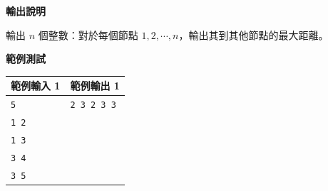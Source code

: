     \textbf{輸出說明}

    輸出 $n$ 個整數：對於每個節點 $1, 2,\cdots , n$，輸出其到其他節點的最大距離。

    \textbf{範例測試}

    \begin{tabular}{|m{7cm}|m{7cm}|}
        \hline
        範例輸入 1 & 範例輸出 1 \\
        \hline
        \verb|5|  & \verb|2 3 2 3 3| \\
        \verb|1 2| & \\
        \verb|1 3|  & \\
        \verb|3 4|  & \\
        \verb|3 5|  & \\
        \hline
    \end{tabular}